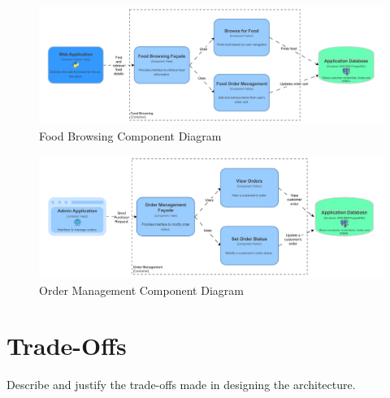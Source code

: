 \documentclass{article}
\begin{document}
\begin{figure}
    \centering
    \includegraphics[width=1.0\linewidth]{model//c4//pdf/food_browsing_drawio.pdf}
    \caption{Food Browsing Component Diagram}
    \label{fig:browse}
\end{figure}

\begin{figure}
    \centering
    \includegraphics[width=1.0\linewidth]{model//c4//pdf/order_management_drawio.pdf}
    \caption{Order Management Component Diagram}
    \label{fig:orders}
\end{figure}
\restoregeometry






\section{Trade-Offs}
Describe and justify the trade-offs made in designing the architecture.
\end{document}
